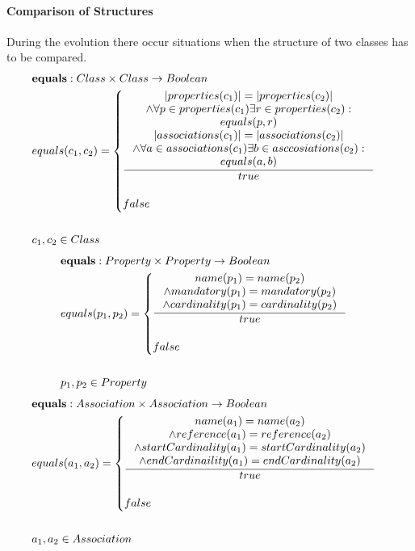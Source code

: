 \documentclass[11pt]{article}
\begin{document}
\paragraph{Comparison of Structures} During the evolution there occur situations when the structure of two classes has to be compared.
\begin{align*}
& \mathbf{equals} : Class \times Class \rightarrow Boolean \\
& equals(c_1, c_2) = \begin{cases}
 	\inference{|properties(c_1)| = |properties(c_2)| \\ \wedge
 	\forall p \in properties(c_1) \exists r \in properties(c_2): \\ equals(p, r) \\
 	|associations(c_1)| = |associations(c_2)| \\
 	\wedge \forall a \in associations(c_1) \exists b \in asccosiations(c_2): \\ equals(a,b) \\ }{true}\\\\
 false
 \end{cases}\\\\
& c_1, c_2 \in Class
\end{align*}
\begin{align*}
& \mathbf{equals} : Property \times Property \rightarrow Boolean \\
& equals(p_1, p_2) = \begin{cases}
	\inference{name(p_1) = name(p_2) \\
	\wedge mandatory(p_1) = mandatory(p_2) \\
	\wedge cardinality(p_1) = cardinality(p_2)}{true}
 \\\\ false
 \end{cases}\\\\
& p_1, p_2 \in Property
\end{align*}
\begin{align*}
& \mathbf{equals} : Association \times Association \rightarrow Boolean \\
& equals(a_1, a_2) = \begin{cases}
	\inference{name(a_1) = name(a_2)\\
	\wedge reference(a_1) = reference(a_2) \\
	\wedge startCardinality(a_1) = startCardinality(a_2) \\
	\wedge endCardinaility(a_1) = endCardinality(a_2)
	}{true}
 \\\\ false
 \end{cases}\\\\
& a_1, a_2 \in Association
\end{align*}
\end{document}
